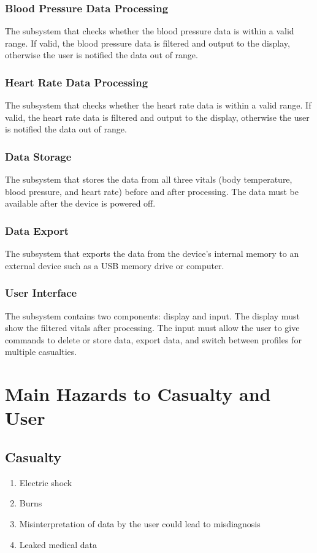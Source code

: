 \documentclass{article}
\begin{document}
    \subsubsection{Blood Pressure Data Processing}
    The subsystem that checks whether the blood pressure data is within a valid range.  If valid, the blood pressure data is filtered and output to the display, otherwise the user is notified the data out of range.
    \subsubsection{Heart Rate Data Processing}
    The subsystem that checks whether the heart rate data is within a valid range.  If valid, the heart rate data is filtered and output to the display, otherwise the user is notified the data out of range.
    \subsubsection{Data Storage}
    The subsystem that stores the data from all three vitals (body temperature, blood pressure, and heart rate) before and after processing.  The data must be available after the device is powered off. 
    \subsubsection{Data Export}
    The subsystem that exports the data from the device's internal memory to an external device such as a USB memory drive or computer.  
    \subsubsection{User Interface}
    The subsystem contains two components: display and input.  The display must show the filtered vitals after processing.  The input must allow the user to give commands to delete or store data, export data, and switch between profiles for multiple casualties.  
    
    \section{Main Hazards to Casualty and User}
    \subsection{Casualty}
    \begin{enumerate}[label = (\alph*) ] 
        \item Electric shock
        \item Burns
        \item Misinterpretation of data by the user could lead to misdiagnosis
        \item Leaked medical data
    \end{enumerate}
    
\end{document}
